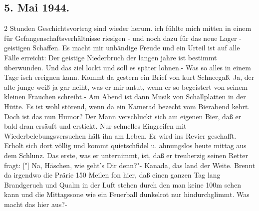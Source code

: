 \subsection{5. Mai 1944.}

2 Stunden Geschichtsvortrag sind wieder herum.
ich f\"{u}hlte mich mitten in einem f\"{u}r Gefangenschaftsverh\"{a}ltnisse riesigen - und noch dazu f\"{u}r das neue Lager - geistigen Schaffen.
Es macht mir unb\"{a}ndige Freude und ein Urteil ist auf alle F\"{a}lle erreicht: Der geistige Niederbruch der langen jahre ist bestimmt \"{u}berwunden.
Und das ziel lockt und soll es sp\"{a}ter lohnen.-
Was so alles in einem Tage isch ereignen kann.
Kommt da gestern ein Brief von kurt Schneega{\ss}.
Ja, der alte junge wei{\ss} ja gar nciht, was er mir antut, wenn er so begeistert von seinem kleinen Frauchen schreibt.-
Am Abend ist dann Musik von Schallplatten in der H\"{u}tte.
Es ist wohl st\"{o}rend, wenn da ein Kamerad bezecht vom Bierabend kehrt.
Doch ist das nun Humor?
Der Mann verschluckt sich am eigenen Bier, da{\ss} er bald dran ers\"{a}uft und erstickt.
Nur schnelles Eingreifen mit Wiederbelebungsversuchen h\"{a}lt ihn am Leben.
Er wird ins Revier geschafft.
Erholt sich dort v\"{o}llig und kommt quietschfidel u. ahnungslos heute mittag aus dem Schlunz.
Das erste, was er unternimmt, ist, da{\ss} er treuherzig seinen Retter fragt: {\color{red} ["] }Na, H\"{a}schen, wie geht's Dir denn?"-
Kanada, das land der Weite.
Brennt da irgendwo die Pr\"{a}rie 150 Meilen fon hier, da{\ss} einen ganzen Tag lang Brandgeruch und Qualm in der Luft stehen durch den man keine 100m sehen kann und die Mittagssone wie ein Feuerball dunkelrot nur hindurchglimmt.
Was macht das hier aus?-

\clearpage
